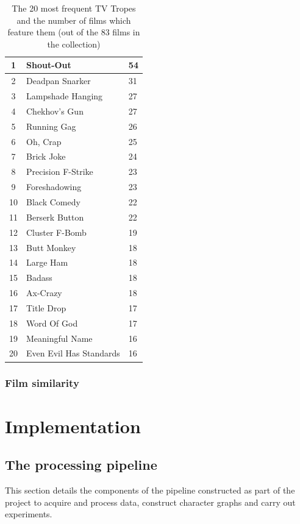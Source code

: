 \documentclass[bsc,frontabs,singlespacing,parskip]{infthesis} %
\begin{document}
\begin{table}[!htb]
\centering
\begin{tabular}{|c||l|l|}
\hline
1 & Shout-Out & 54 \\ \hline
2 & Deadpan Snarker & 31 \\ \hline
3 & Lampshade Hanging & 27 \\ \hline
4 & Chekhov's Gun & 27 \\ \hline
5 & Running Gag & 26 \\ \hline
6 & Oh, Crap & 25 \\ \hline
7 & Brick Joke & 24 \\ \hline
8 & Precision F-Strike & 23 \\ \hline
9 & Foreshadowing & 23 \\ \hline
10 & Black Comedy & 22 \\ \hline
11 & Berserk Button & 22 \\ \hline
12 & Cluster F-Bomb & 19 \\ \hline
13 & Butt Monkey & 18 \\ \hline
14 & Large Ham & 18 \\ \hline
15 & Badass & 18 \\ \hline
16 & Ax-Crazy & 18 \\ \hline
17 & Title Drop & 17 \\ \hline
18 & Word Of God & 17 \\ \hline
19 & Meaningful Name & 16 \\ \hline
20 & Even Evil Has Standards & 16 \\ \hline

\end{tabular}

\caption{The 20 most frequent TV Tropes and the number of films which feature them (out of the 83 films in the collection)}

\end{table}
\subsection{Film similarity}

\chapter{Implementation}

\section{The processing pipeline}
This section details the components of the pipeline constructed as part of the project to acquire and process data, construct character graphs and carry out experiments.
\end{document}
